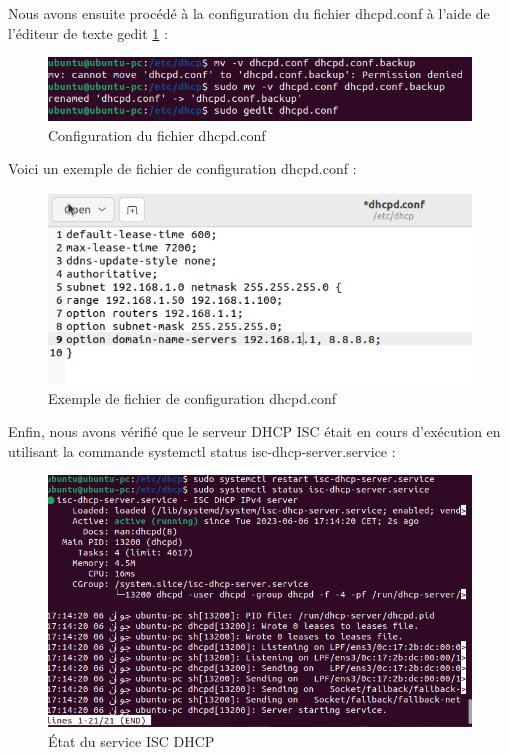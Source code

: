 Nous avons ensuite procédé à la configuration du fichier dhcpd.conf à l'aide de l'éditeur de texte gedit \ref{fig:dhcpd-conf-configuration} : \\

\begin{figure}[H]
 \centering
    \includegraphics[width=15cm]{Images/dhcp3.png}
    \caption{Configuration du fichier dhcpd.conf}
    \label{fig:dhcpd-conf-configuration}
\end{figure}

Voici un exemple de fichier de configuration dhcpd.conf : \\

\begin{figure}[H]
 \centering
    \includegraphics[width=15cm]{Images/dhcp4.png}
    \caption{Exemple de fichier de configuration dhcpd.conf}
    \label{fig:dhcpd-conf-example}
\end{figure}

Enfin, nous avons vérifié que le serveur DHCP ISC était en cours d'exécution en utilisant la commande systemctl status isc-dhcp-server.service : \\

\begin{figure}[H]
 \centering
    \includegraphics[width=15cm]{Images/dhcp5.png}
    \caption{État du service ISC DHCP}
    \label{fig:isc-dhcp-service-status}
\end{figure}

